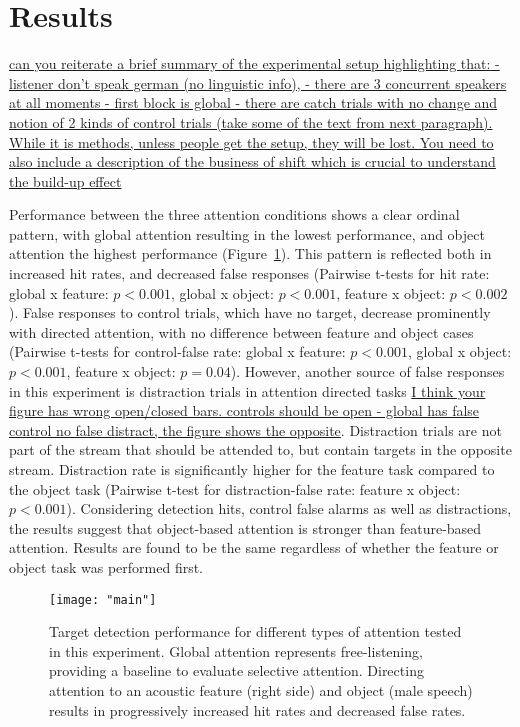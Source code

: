 \documentclass[9pt,twocolumn,twoside]{pnas-new}
\begin{document}
\section{Results}

\underline{can you reiterate a brief summary of the experimental setup highlighting that: - listener don't speak german (no linguistic info), - there are 3 concurrent speakers at all moments - first block is global - there are catch trials with no change and notion of 2 kinds of control trials (take some of the text from next paragraph). While it is methods, unless people get the setup, they will be lost. You need to also include a description of the business of shift which is crucial to understand the build-up effect}

Performance between the three attention conditions shows a clear ordinal pattern, with global attention resulting in the lowest performance, and object attention the highest performance (Figure~\ref{fig:attn_hr}). This pattern is reflected both in increased hit rates, and decreased false responses (Pairwise t-tests for hit rate: global x feature: $p<0.001$, global x object: $p<0.001$, feature x object: $p<0.002$). False responses to control trials, which have no target, decrease prominently with directed attention, with no difference between feature and object cases (Pairwise t-tests for control-false rate: global x feature: $p<0.001$, global x object: $p<0.001$, feature x object: $p=0.04$). However, another source of false responses in this experiment is distraction trials in attention directed tasks \underline{I think your figure has wrong open/closed bars. controls should be open - global has false control no false distract, the figure shows the opposite}. Distraction trials are not part of the stream that should be attended to, but contain targets in the opposite stream. Distraction rate is significantly higher for the feature task compared to the object task (Pairwise t-test for distraction-false rate: feature x object: $p<0.001$). Considering detection hits, control false alarms as well as distractions, the results suggest that object-based attention is stronger than feature-based attention. Results are found to be the same regardless of whether the feature or object task was performed first.

\begin{figure}[t]
\centering
\texttt{[image: "main"]}
\caption[Global, feature-based, and object-based attention comparison.]{Target detection performance for different types of attention tested in this experiment. Global attention represents free-listening, providing a baseline to evaluate selective attention. Directing attention to an acoustic feature (right side) and object (male speech) results in progressively increased hit rates and decreased false rates.}
\label{fig:attn_hr}
\end{figure}
\end{document}
